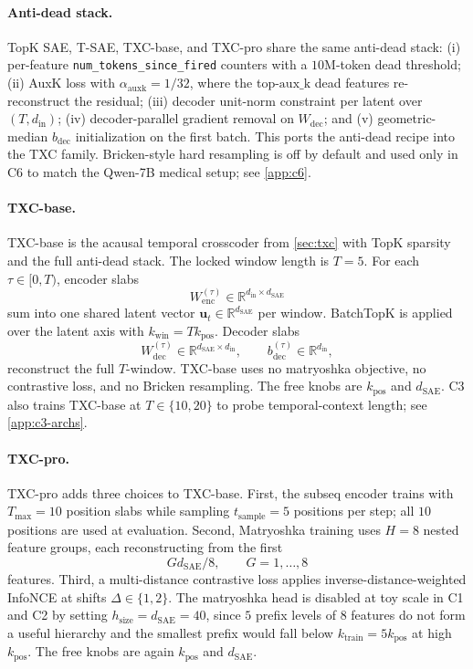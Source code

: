 \paragraph{Anti-dead stack.}
TopK SAE, T-SAE, TXC-base, and TXC-pro share the same anti-dead stack: (i) per-feature \texttt{num\_tokens\_since\_fired} counters with a $10$M-token dead threshold; (ii) AuxK loss with $\alpha_{\mathrm{auxk}}=1/32$, where the top-$\mathrm{aux\_k}$ dead features re-reconstruct the residual; (iii) decoder unit-norm constraint per latent over $(T,d_{\mathrm{in}})$; (iv) decoder-parallel gradient removal on $W_{\mathrm{dec}}$; and (v) geometric-median $b_{\mathrm{dec}}$ initialization on the first batch. This ports the \citet{bhalla2025tsae} anti-dead recipe into the TXC family. Bricken-style hard resampling \citep{bricken2023monosemantic} is off by default and used only in C6 to match the Qwen-7B medical setup; see \cref{app:c6}.

\paragraph{TXC-base.}
TXC-base is the acausal temporal crosscoder from \cref{sec:txc} with TopK sparsity and the full anti-dead stack. The locked window length is $T=5$. For each $\tau\in[0,T)$, encoder slabs
\[
    W_{\mathrm{enc}}^{(\tau)}\in\mathbb{R}^{d_{\mathrm{in}}\times d_{\mathrm{SAE}}}
\]
sum into one shared latent vector $\mathbf u_t\in\mathbb{R}^{d_{\mathrm{SAE}}}$ per window. BatchTopK is applied over the latent axis with $k_{\mathrm{win}}=T k_{\mathrm{pos}}$. Decoder slabs
\[
    W_{\mathrm{dec}}^{(\tau)}\in\mathbb{R}^{d_{\mathrm{SAE}}\times d_{\mathrm{in}}},
    \qquad
    b_{\mathrm{dec}}^{(\tau)}\in\mathbb{R}^{d_{\mathrm{in}}},
\]
reconstruct the full $T$-window. TXC-base uses no matryoshka objective, no contrastive loss, and no Bricken resampling. The free knobs are $k_{\mathrm{pos}}$ and $d_{\mathrm{SAE}}$. C3 also trains TXC-base at $T\in\{10,20\}$ to probe temporal-context length; see \cref{app:c3-archs}.

\paragraph{TXC-pro.}
TXC-pro adds three choices to TXC-base. First, the subseq encoder trains with $T_{\max}=10$ position slabs while sampling $t_{\mathrm{sample}}=5$ positions per step; all $10$ positions are used at evaluation. Second, Matryoshka training uses $H=8$ nested feature groups, each reconstructing from the first
\[
    G d_{\mathrm{SAE}}/8,
    \qquad
    G=1,\ldots,8
\]
features. Third, a multi-distance contrastive loss applies inverse-distance-weighted InfoNCE at shifts $\Delta\in\{1,2\}$. The matryoshka head is disabled at toy scale in C1 and C2 by setting $h_{\mathrm{size}}=d_{\mathrm{SAE}}=40$, since $5$ prefix levels of $8$ features do not form a useful hierarchy and the smallest prefix would fall below $k_{\mathrm{train}}=5k_{\mathrm{pos}}$ at high $k_{\mathrm{pos}}$. The free knobs are again $k_{\mathrm{pos}}$ and $d_{\mathrm{SAE}}$.

